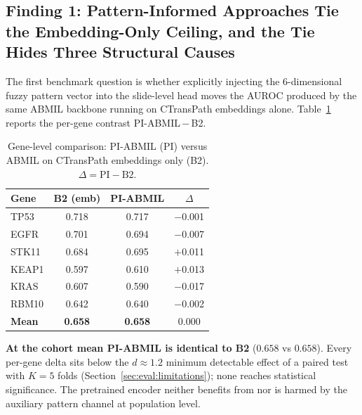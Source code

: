 \subsection{Finding 1: Pattern-Informed Approaches Tie the
Embedding-Only Ceiling, and the Tie Hides Three Structural Causes}
\label{sec:eval:mutation:finding1}

The first benchmark question is whether explicitly injecting the
6-dimensional fuzzy pattern vector into the slide-level head moves
the AUROC produced by the same ABMIL backbone running on
CTransPath embeddings alone.
Table~\ref{tab:p_vs_b2} reports the per-gene contrast
PI-ABMIL\,$-$\,B2.

\begin{table}[ht!]
\centering
\caption{Gene-level comparison: PI-ABMIL (PI) versus ABMIL on
CTransPath embeddings only (B2).
$\Delta = \text{PI} - \text{B2}$.}
\label{tab:p_vs_b2}
\begin{tabular}{l c c c}
\hline
\textbf{Gene} & \textbf{B2 (emb)} & \textbf{PI-ABMIL} & \textbf{$\Delta$} \\
\hline
TP53  & 0.718 & 0.717 & $-$0.001 \\
EGFR  & 0.701 & 0.694 & $-$0.007 \\
STK11 & 0.684 & 0.695 & $+$0.011 \\
KEAP1 & 0.597 & 0.610 & $+$0.013 \\
KRAS  & 0.607 & 0.590 & $-$0.017 \\
RBM10 & 0.642 & 0.640 & $-$0.002 \\
\hline
\textbf{Mean} & \textbf{0.658} & \textbf{0.658} & \phantom{$-$}0.000 \\
\hline
\end{tabular}
\end{table}

\textbf{At the cohort mean PI-ABMIL is identical to B2}
($0.658$ vs $0.658$).
Every per-gene delta sits below the $d \approx 1.2$ minimum
detectable effect of a paired test with $K = 5$ folds
(Section~\ref{sec:eval:limitations}); none reaches statistical
significance.
The pretrained encoder neither benefits from nor is harmed by the
auxiliary pattern channel at population level.

